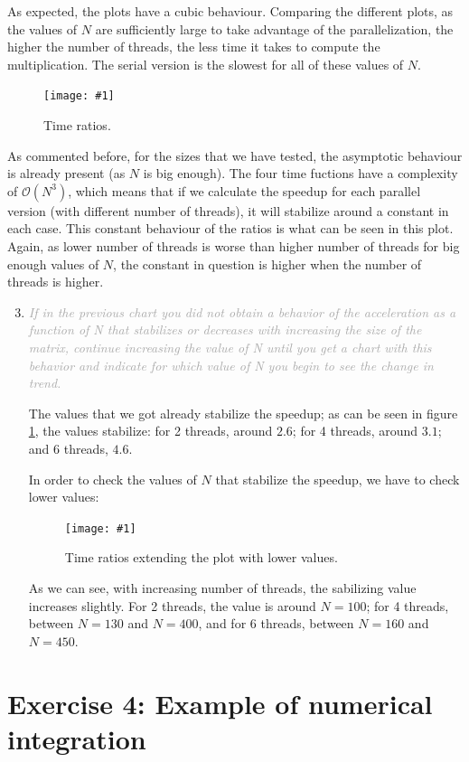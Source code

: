 \documentclass{article}
\newcommand{\myFigure}[4]{%
    \begin{figure}[!ht]
        \texttt{[image: \#1]}
        \centering
        \caption{#2}
        \label{#3}
    \end{figure}
}
\newcommand{\greyItem}[1]{\item\emph{\textcolor{darkgray}{#1}}}
\begin{document}
As expected, the plots have a cubic behaviour. Comparing the different plots, as the values of $N$ are sufficiently large to take advantage of the parallelization, the higher the number of threads, the less time it takes to compute the multiplication. The serial version is the slowest for all of these values of $N$.

\myFigure{../material/outputs/out3/test_cl0/r_fig.png}{Time ratios.}{ratios}{0.65}

As commented before, for the sizes that we have tested, the asymptotic behaviour is already present (as $N$ is big enough). The four time fuctions have a complexity of $\mathcal{O}(N^3)$, which means that if we calculate the speedup for each parallel version (with different number of threads), it will stabilize around a constant in each case. This constant behaviour of the ratios is what can be seen in this plot. Again, as lower number of threads is worse than higher number of threads for big enough values of $N$, the constant in question is higher when the number of threads is higher.

\begin{enumerate}[label=3.\arabic*,leftmargin=*]
    \setcounter{enumi}{2}
\greyItem{If in the previous chart you did not obtain a behavior of the acceleration as a function of N that stabilizes or decreases with increasing the size of the matrix, continue increasing the value of N until you get a chart with this behavior and indicate for which value of N you begin to see the change in trend.}

The values that we got already stabilize the speedup; as can be seen in figure \ref{ratios}, the values stabilize: for 2 threads, around $2.6$; for 4 threads, around $3.1$; and 6 threads, $4.6$.

In order to check the values of $N$ that stabilize the speedup, we have to check lower values:

\myFigure{../material/outputs/out3/test_cl0_extended/r_fig.png}{Time ratios extending the plot with lower values.}{ratios_extended}{0.63}

As we can see, with increasing number of threads, the sabilizing value increases slightly. For 2 threads, the value is around $N=100$; for 4 threads, between $N=130$ and $N=400$, and for 6 threads, between $N=160$ and $N=450$.


\end{enumerate}

\pagebreak

\section{Exercise 4: Example of numerical integration}
\end{document}
